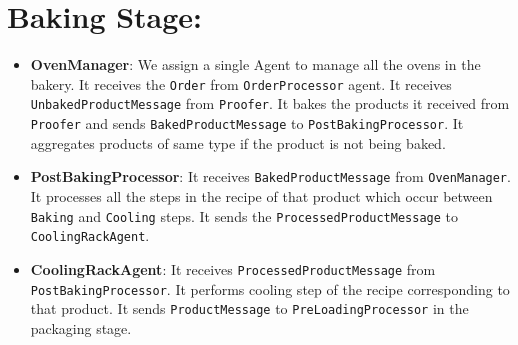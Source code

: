 \documentclass[12pt]{article}
\begin{document}
\section{Baking Stage:}
\begin{itemize}
    \item \textbf{OvenManager}: 
 We assign a single Agent to manage all the ovens in the bakery.
 It receives the \texttt{Order} from \texttt{OrderProcessor} agent. 
 It receives \texttt{UnbakedProductMessage} from \texttt{Proofer}.
 It bakes the products it received from \texttt{Proofer} and sends \texttt{BakedProductMessage} to \texttt{PostBakingProcessor}.
 It aggregates products of same type if the product is not being baked. 
    \item \textbf{PostBakingProcessor}:
 It receives \texttt{BakedProductMessage} from \texttt{OvenManager}.
 It processes all the steps in the recipe of that product which occur between \texttt{Baking} and \texttt{Cooling} steps. 
 It sends the \texttt{ProcessedProductMessage} to \texttt{CoolingRackAgent}.
    \item \textbf{CoolingRackAgent}:
 It receives \texttt{ProcessedProductMessage} from \texttt{PostBakingProcessor}.
 It performs cooling step of the recipe corresponding to that product.
 It sends \texttt{ProductMessage} to \texttt{PreLoadingProcessor} in the packaging stage.
\end{itemize}
\end{document}
